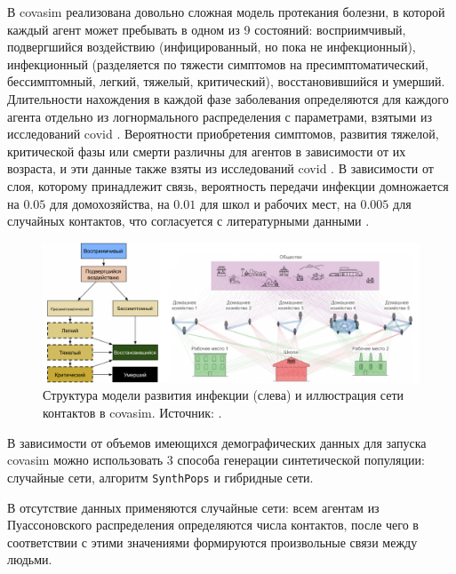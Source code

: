 \documentclass[a4paper,12pt]{article} %
\begin{document}
В \gls{covasim} реализована довольно сложная модель протекания болезни, в которой каждый агент может пребывать в одном из 9 состояний: восприимчивый, подвергшийся воздействию (инфицированный, но пока не инфекционный), инфекционный (разделяется по тяжести симптомов на пресимптоматический, бессимптомный, легкий, тяжелый, критический), восстановившийся и умерший. Длительности нахождения в каждой фазе заболевания определяются для каждого агента отдельно из логнормального распределения с параметрами, взятыми из исследований \gls{covid} \cite{lauer2020incubation, du2020serial, nishiura2020serial, pung2020investigation, linton2020incubation, he2020temporal, wang2020clinical, chen2020clinical, verity2020estimates, wolfel2020virological}. Вероятности приобретения симптомов, развития тяжелой, критической фазы или смерти различны для агентов в зависимости от их возраста, и эти данные также взяты из исследований \gls{covid} \cite{chen2020clinical, wolfel2020virological, o2021age, baguelin2020report, ferguson2020impact}. В зависимости от слоя, которому принадлежит связь, вероятность передачи инфекции домножается на $0.05$ для домохозяйства, на $0.01$ для школ и рабочих мест, на $0.005$ для случайных контактов, что согласуется с литературными данными \cite{zhang2020changes, lader2006time}.

\begin{figure}[]
    \centering
    \includegraphics[width=\linewidth]{images/covasim.pdf}
    \caption{Структура модели развития инфекции (слева) и иллюстрация сети контактов в \gls{covasim}. Источник: \cite{kerr2021covasim}.}
\end{figure}

В зависимости от объемов имеющихся демографических данных для запуска \gls{covasim} можно использовать 3 способа генерации синтетической популяции: случайные сети, алгоритм \texttt{SynthPops} и гибридные сети.

В отсутствие данных применяются случайные сети: всем агентам из Пуассоновского распределения определяются числа контактов, после чего в соответствии с этими значениями формируются произвольные связи между людьми.
\end{document}
